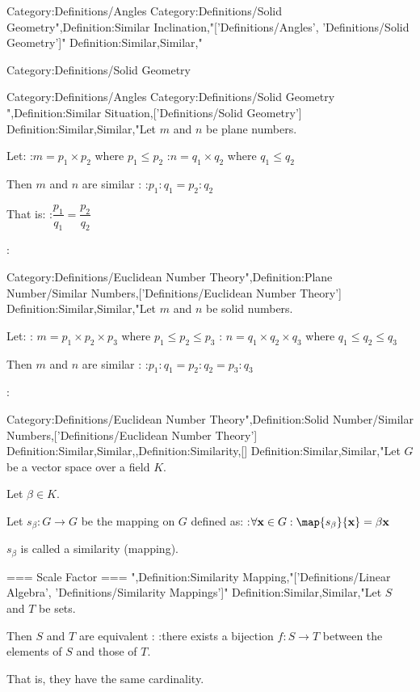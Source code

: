 Category:Definitions/Angles
Category:Definitions/Solid Geometry",Definition:Similar Inclination,"['Definitions/Angles', 'Definitions/Solid Geometry']"
Definition:Similar,Similar,"



Category:Definitions/Solid Geometry


Category:Definitions/Angles
Category:Definitions/Solid Geometry
",Definition:Similar Situation,['Definitions/Solid Geometry']
Definition:Similar,Similar,"Let $m$ and $n$ be plane numbers.

Let:
:$m = p_1 \times p_2$ where $p_1 \le p_2$
:$n = q_1 \times q_2$ where $q_1 \le q_2$

Then $m$ and $n$ are similar :
:$p_1 : q_1 = p_2 : q_2$


That is:
:$\dfrac {p_1} {q_1} = \dfrac {p_2} {q_2}$



:


Category:Definitions/Euclidean Number Theory",Definition:Plane Number/Similar Numbers,['Definitions/Euclidean Number Theory']
Definition:Similar,Similar,"Let $m$ and $n$ be solid numbers.

Let:
: $m = p_1 \times p_2 \times p_3$ where $p_1 \le p_2 \le p_3$
: $n = q_1 \times q_2 \times q_3$ where $q_1 \le q_2 \le q_3$

Then $m$ and $n$ are similar :
:$p_1 : q_1 = p_2 : q_2 = p_3 : q_3$



:


Category:Definitions/Euclidean Number Theory",Definition:Solid Number/Similar Numbers,['Definitions/Euclidean Number Theory']
Definition:Similar,Similar,,Definition:Similarity,[]
Definition:Similar,Similar,"Let $G$ be a vector space over a field $K$.

Let $\beta \in K$.

Let $s_\beta: G \to G$ be the mapping on $G$ defined as:
:$\forall \mathbf x \in G: \map {s_\beta} {\mathbf x} = \beta \mathbf x$


$s_\beta$ is called a similarity (mapping).


=== Scale Factor ===
",Definition:Similarity Mapping,"['Definitions/Linear Algebra', 'Definitions/Similarity Mappings']"
Definition:Similar,Similar,"Let $S$ and $T$ be sets.

Then $S$ and $T$ are equivalent :
:there exists a bijection $f: S \to T$ between the elements of $S$ and those of $T$.

That is,  they have the same cardinality.


